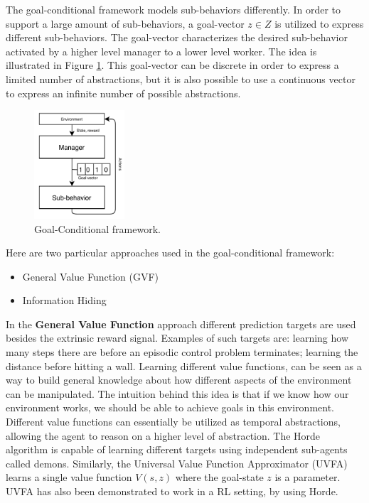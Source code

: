 The goal-conditional framework models sub-behaviors differently. In order to support a large amount of sub-behaviors,
a goal-vector $z \in Z$ is utilized to express different sub-behaviors.
The goal-vector characterizes the desired sub-behavior activated by a higher level manager to a lower level worker.
The idea is illustrated in Figure \ref{fig:goal-conditional}. This goal-vector can be discrete in order to express
a limited number of abstractions, but it is also possible to use a continuous vector to express an infinite number of possible abstractions.


\begin{figure}
    \centering
    \includegraphics[width=0.3\textwidth]{Images/goal-conditional.png}
    \caption{Goal-Conditional framework.}
    \label{fig:goal-conditional}
\end{figure}

Here are two particular approaches used in the goal-conditional framework:

\begin{itemize}
    \item General Value Function (GVF)
    \item Information Hiding
\end{itemize}

In the \textbf{General Value Function} \cite{Horde} approach different prediction targets are used besides the extrinsic reward signal.
Examples of such targets are: learning how many steps there are
before an episodic control problem terminates; learning the distance before hitting a wall.
Learning different value functions, can be seen as a way to build general knowledge about
how different aspects of the environment can be manipulated. The intuition behind this
idea is that if we know how our environment works, we should be able to achieve
goals in this environment. Different value functions can essentially be utilized as temporal
abstractions, allowing the agent to reason on a higher level of abstraction.
The Horde algorithm \cite{Horde} is capable of learning different targets using independent sub-agents called demons.
Similarly, the Universal Value Function Approximator (UVFA) learns a single value function $V(s, z)$ where the goal-state $z$ is a parameter.
UVFA has also been demonstrated to work in a RL setting, by using Horde.

